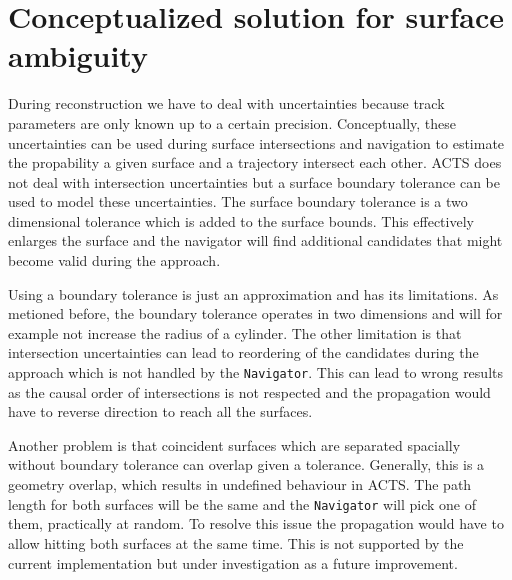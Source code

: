 \section{Conceptualized solution for surface ambiguity}

During reconstruction we have to deal with uncertainties because track parameters are only known up to a certain precision. Conceptually, these uncertainties can be used during surface intersections and navigation to estimate the propability a given surface and a trajectory intersect each other. ACTS does not deal with intersection uncertainties but a surface boundary tolerance can be used to model these uncertainties. The surface boundary tolerance is a two dimensional tolerance which is added to the surface bounds. This effectively enlarges the surface and the navigator will find additional candidates that might become valid during the approach.

Using a boundary tolerance is just an approximation and has its limitations. As metioned before, the boundary tolerance operates in two dimensions and will for example not increase the radius of a cylinder. The other limitation is that intersection uncertainties can lead to reordering of the candidates during the approach which is not handled by the \texttt{Navigator}. This can lead to wrong results as the causal order of intersections is not respected and the propagation would have to reverse direction to reach all the surfaces.

Another problem is that coincident surfaces which are separated spacially without boundary tolerance can overlap given a tolerance. Generally, this is a geometry overlap, which results in undefined behaviour in ACTS. The path length for both surfaces will be the same and the \texttt{Navigator} will pick one of them, practically at random. To resolve this issue the propagation would have to allow hitting both surfaces at the same time. This is not supported by the current implementation but under investigation as a future improvement.
